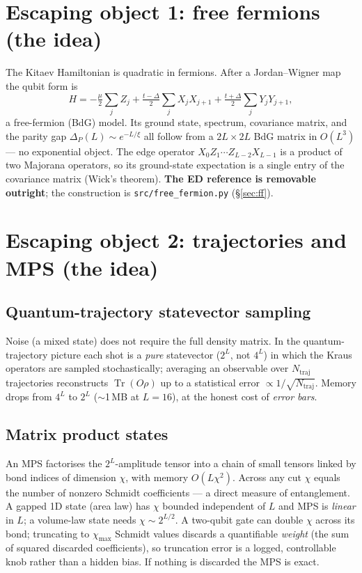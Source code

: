 \documentclass[11pt]{article}
\newcommand{\Oedge}{X_0 Z_1\cdots Z_{L-2} X_{L-1}}
\newcommand{\Tr}{\operatorname{Tr}}
\newcommand{\chimax}{\chi_{\max}}
\newcommand{\code}[1]{\texttt{#1}}
\begin{document}
\section{Escaping object 1: free fermions (the idea)}
The Kitaev Hamiltonian is quadratic in fermions. After a Jordan--Wigner map the
qubit form is
\[
H=-\tfrac{\mu}{2}\sum_j Z_j
  +\tfrac{t-\Delta}{2}\sum_j X_jX_{j+1}
  +\tfrac{t+\Delta}{2}\sum_j Y_jY_{j+1},
\]
a free-fermion (BdG) model. Its ground state, spectrum, covariance matrix, and
the parity gap $\Delta_P(L)\sim e^{-L/\xi}$ all follow from a $2L\times 2L$ BdG
matrix in $O(L^3)$ --- no exponential object. The edge operator $\Oedge$ is a
product of two Majorana operators, so its ground-state expectation is a single
entry of the covariance matrix (Wick's theorem). \textbf{The ED reference is
removable outright}; the construction is \code{src/free\_fermion.py}
(\S\ref{sec:ff}).

\section{Escaping object 2: trajectories and MPS (the idea)}
\subsection{Quantum-trajectory statevector sampling}
Noise (a mixed state) does not require the full density matrix. In the
quantum-trajectory picture each shot is a \emph{pure} statevector ($2^L$, not
$4^L$) in which the Kraus operators are sampled stochastically; averaging an
observable over $N_{\text{traj}}$ trajectories reconstructs $\Tr(O\rho)$ up to a
statistical error $\propto 1/\sqrt{N_{\text{traj}}}$. Memory drops from $4^L$ to
$2^L$ ($\sim$1\,MB at $L=16$), at the honest cost of \emph{error bars}.

\subsection{Matrix product states}
An MPS factorises the $2^L$-amplitude tensor into a chain of small tensors linked
by bond indices of dimension $\chi$, with memory $O(L\chi^2)$. Across any cut
$\chi$ equals the number of nonzero Schmidt coefficients --- a direct measure of
entanglement. A gapped 1D state (area law) has $\chi$ bounded independent of $L$
and MPS is \emph{linear} in $L$; a volume-law state needs $\chi\sim 2^{L/2}$.
A two-qubit gate can double $\chi$ across its bond; truncating to $\chimax$
Schmidt values discards a quantifiable \emph{weight} (the sum of squared
discarded coefficients), so truncation error is a logged, controllable knob
rather than a hidden bias. If nothing is discarded the MPS is exact.
\end{document}

